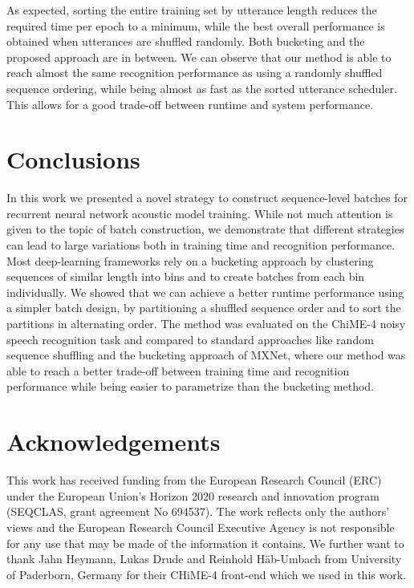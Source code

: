 \documentclass{article}
\begin{document}
  As expected, sorting the entire training set by utterance length reduces the required time 
  per epoch to a minimum, while the best overall performance is obtained when utterances are shuffled randomly. Both bucketing and the proposed 
  approach are in between. We can observe that our method is able to reach almost the same recognition performance as using a randomly shuffled sequence
  ordering, while being almost as fast as the sorted utterance scheduler. This allows for a good trade-off between runtime and system performance.
  
      
  \section{Conclusions}
    In this work we presented a novel strategy to construct sequence-level batches for recurrent 
    neural network acoustic model training. While not much attention is given to the topic 
    of batch construction, we demonstrate that different strategies can lead to large variations 
    both in training time and recognition performance. Most deep-learning frameworks rely on a bucketing approach by clustering sequences of similar length into bins and to create batches from each bin individually. We showed that we can achieve a better runtime performance using a simpler batch design, by partitioning a shuffled sequence order and to sort the partitions in alternating order. The method was evaluated on the ChiME-4 noisy speech recognition task and 
    compared to standard approaches like random sequence shuffling and the bucketing approach of MXNet,
    where our method was able to reach a better trade-off between training time and recognition performance while being easier to parametrize than the bucketing method.
    

   \section{Acknowledgements}
 
   This work has received funding from the European Research Council
   (ERC) under the European Union’s Horizon 2020 research and innovation
   program (SEQCLAS, grant agreement No 694537).  The work reflects
   only the authors' views and the European Research Council Executive
   Agency is not responsible for any use that may be made of the
   information it contains.  We further want to thank Jahn Heymann, Lukas
   Drude and Reinhold H\"ab-Umbach from University of Paderborn, Germany
   for their CHiME-4 front-end which we used in this work.
   
   \ninept
   
   
\end{document}
